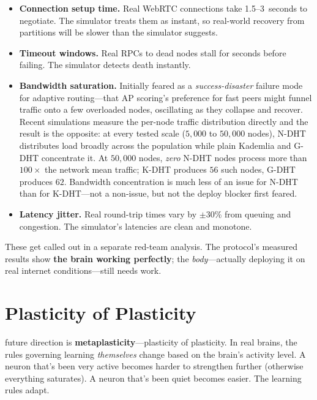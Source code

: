 \documentclass[nobib]{tufte-handout}
\begin{document}
\begin{itemize}
  \item \textbf{Connection setup time.} Real WebRTC connections take 1.5--3~seconds to negotiate. The simulator treats them as instant, so real-world recovery from partitions will be slower than the simulator suggests.
  \item \textbf{Timeout windows.} Real RPCs to dead nodes stall for seconds before failing. The simulator detects death instantly.
  \item \textbf{Bandwidth saturation.} Initially feared as a \emph{success-disaster} failure mode for adaptive routing---that AP scoring's preference for fast peers might funnel traffic onto a few overloaded nodes, oscillating as they collapse and recover. Recent simulations measure the per-node traffic distribution directly and the result is the opposite: at every tested scale ($5{,}000$ to $50{,}000$ nodes), N-DHT distributes load broadly across the population while plain Kademlia and G-DHT concentrate it. At $50{,}000$ nodes, \emph{zero} N-DHT nodes process more than $100\times$ the network mean traffic; K-DHT produces $56$ such nodes, G-DHT produces $62$. Bandwidth concentration is much less of an issue for N-DHT than for K-DHT---not a non-issue, but not the deploy blocker first feared.
  \item \textbf{Latency jitter.} Real round-trip times vary by $\pm$30\% from queuing and congestion. The simulator's latencies are clean and monotone.
\end{itemize}

These get called out in a separate red-team analysis. The protocol's measured results show \textbf{the brain working perfectly}; the \emph{body}---actually deploying it on real internet conditions---still needs work.

\section{Plasticity of Plasticity}

 future direction is \textbf{metaplasticity}---plasticity of plasticity. In real brains, the rules governing learning \emph{themselves} change based on the brain's activity level. A neuron that's been very active becomes harder to strengthen further (otherwise everything saturates). A neuron that's been quiet becomes easier. The learning rules adapt.
\end{document}
